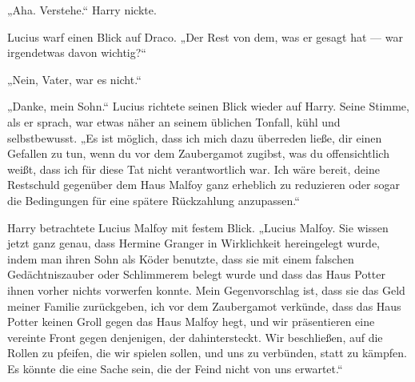 „Aha. Verstehe.“ Harry nickte.

Lucius warf einen Blick auf Draco.
„Der Rest von dem, was er gesagt hat — war irgendetwas davon wichtig?“

„Nein, Vater, war es nicht.“

„Danke, mein Sohn.“ Lucius richtete seinen Blick wieder auf Harry. Seine Stimme, als er sprach, war etwas näher an seinem üblichen Tonfall, kühl und selbstbewusst.
„Es ist möglich, dass ich mich dazu überreden ließe, dir einen Gefallen zu tun, wenn du vor dem Zaubergamot zugibst, was du offensichtlich weißt, dass ich für diese Tat nicht verantwortlich war. Ich wäre bereit, deine Restschuld gegenüber dem Haus Malfoy ganz erheblich zu reduzieren oder sogar die Bedingungen für eine spätere Rückzahlung anzupassen.“

Harry betrachtete Lucius Malfoy mit festem Blick.
„Lucius Malfoy. Sie wissen jetzt ganz genau, dass Hermine Granger in Wirklichkeit hereingelegt wurde, indem man ihren Sohn als Köder benutzte, dass sie mit einem falschen Gedächtniszauber oder Schlimmerem belegt wurde und dass das Haus Potter ihnen vorher nichts vorwerfen konnte. Mein Gegenvorschlag ist, dass sie das Geld meiner Familie zurückgeben, ich vor dem Zaubergamot verkünde, dass das Haus Potter keinen Groll gegen das Haus Malfoy hegt, und wir präsentieren eine vereinte Front gegen denjenigen, der dahintersteckt. Wir beschließen, auf die Rollen zu pfeifen, die wir spielen sollen, und uns zu verbünden, statt zu kämpfen. Es könnte die eine Sache sein, die der Feind nicht von uns erwartet.“

